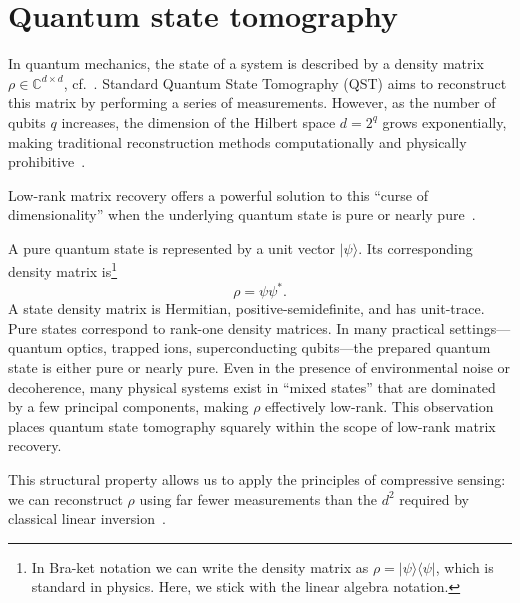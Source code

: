 \section{Quantum state tomography}\label{s:quantum}

In quantum mechanics, the state of a system is described by a density matrix $\rho \in \mathbb{C}^{d \times d}$, cf.~\cite{nielsen2010quantum}. Standard Quantum State Tomography (QST) aims to reconstruct this matrix by performing a series of measurements. However, as the number of qubits $q$ increases, the dimension of the Hilbert space $d = 2^q$ grows exponentially, making traditional reconstruction methods computationally and physically prohibitive~\cite{paris2004quantum}.

Low-rank matrix recovery offers a powerful solution to this ``curse of dimensionality'' when the underlying quantum state is pure or nearly pure~\cite{gross2010quantum}.

A pure quantum state is represented by a unit vector $|\psi\rangle$. Its corresponding density matrix is\footnote{In Bra-ket notation we can write the density matrix  as $\rho = |\psi\rangle \langle \psi|$, which is standard in physics. Here, we stick with the linear algebra notation.}
$$\rho = \psi \psi^{\ast}.$$
A state density matrix is Hermitian, positive-semidefinite, and has unit-trace. Pure states correspond to rank-one density matrices. In many practical settings---quantum optics, trapped ions, superconducting qubits---the prepared quantum state is either pure or nearly pure. Even in the presence of environmental noise or decoherence, many physical systems exist in ``mixed states'' that are dominated by a few principal components, making $\rho$ effectively low-rank. This observation places quantum state tomography squarely within the scope of low-rank matrix recovery.


This structural property allows us to apply the principles of compressive sensing: we can reconstruct $\rho$ using far fewer measurements than the $d^2$ required by classical linear inversion~\cite{gross2010quantum}.

